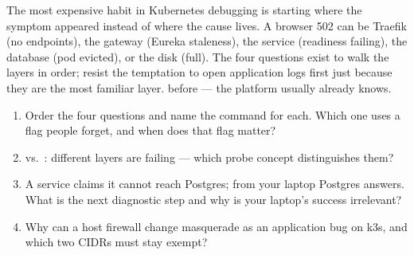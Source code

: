 \begin{pitfall}
The most expensive habit in Kubernetes debugging is starting where the
symptom appeared instead of where the cause lives. A browser 502 can be
Traefik (no endpoints), the gateway (Eureka staleness), the service
(readiness failing), the database (pod evicted), or the disk (full).
The four questions exist to walk the layers in order; resist the
temptation to open application logs first just because they are the
most familiar layer.  before  --- the
platform usually already knows.
\end{pitfall}

\begin{quiz}
\begin{enumerate}
  \item Order the four questions and name the command for each. Which
  one uses a flag people forget, and when does that flag matter?
  \item {} vs.\ : different
  layers are failing --- which probe concept distinguishes them?
  \item A service claims it cannot reach Postgres; from your laptop
  Postgres answers. What is the next diagnostic step and why is your
  laptop's success irrelevant?
  \item Why can a host firewall change masquerade as an application
  bug on k3s, and which two CIDRs must stay exempt?
\end{enumerate}
\end{quiz}
